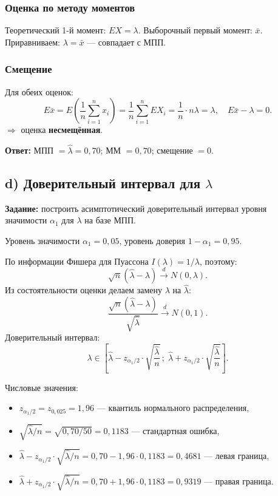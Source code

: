 \documentclass[12pt,a4paper]{article}
\newcommand{\lahat}{\hat{\lambda}}
\newcommand{\xbar}{\bar{x}}
\begin{document}
	\subsubsection*{Оценка по методу моментов}
	
	Теоретический 1-й момент: $EX = \lambda$. Выборочный первый момент: $\xbar$.
	Приравниваем: $\lambda = \xbar$ --- совпадает с МПП.
	
	\subsubsection*{Смещение}
	
	Для обеих оценок:
	\[
	E\xbar = E\!\left(\frac{1}{n}\sum_{i=1}^n x_i\right)
	= \frac{1}{n}\sum_{i=1}^n EX_i = \frac{1}{n}\cdot n\lambda = \lambda,
	\quad E\xbar - \lambda = 0.
	\]
	$\Rightarrow$ оценка \textbf{несмещённая}.
	
	\textbf{Ответ:} МПП $= \lahat = 0{,}70$;\; ММ $= 0{,}70$;\; смещение $= 0$.
	
	\subsection{d) Доверительный интервал для \texorpdfstring{$\lambda$}{lambda}}
	
	\textbf{Задание:} построить асимптотический доверительный интервал уровня
	значимости $\alpha_1$ для $\lambda$ на базе МПП.
	
	Уровень значимости $\alpha_1 = 0{,}05$, уровень доверия $1-\alpha_1 = 0{,}95$.
	
	По информации Фишера для Пуассона $I(\lambda) = 1/\lambda$, поэтому:
	\[
	\sqrt{n}(\lahat-\lambda) \xrightarrow{d} N(0,\lambda).
	\]
	Из состоятельности оценки делаем замену $\lambda$ на $\lahat$:
	\[
	\frac{\sqrt{n}(\lahat-\lambda)}{\sqrt{\lahat}} \xrightarrow{d} N(0,1).
	\]
	Доверительный интервал:
	\[
	\lambda \in \left[\lahat - z_{\alpha_1/2}\cdot\sqrt{\frac{\lahat}{n}}\,;\;
	\lahat + z_{\alpha_1/2}\cdot\sqrt{\frac{\lahat}{n}}\right].
	\]
	
	Числовые значения:
	\begin{itemize}
		\item $z_{\alpha_1/2} = z_{0{,}025} = 1{,}96$ --- квантиль нормального распределения,
		\item $\sqrt{\lahat/n} = \sqrt{0{,}70/50} = 0{,}1183$ --- стандартная ошибка,
		\item $\lahat - z_{\alpha_1/2}\cdot\sqrt{\lahat/n} = 0{,}70 - 1{,}96\cdot0{,}1183 = 0{,}4681$ --- левая граница,
		\item $\lahat + z_{\alpha_1/2}\cdot\sqrt{\lahat/n} = 0{,}70 + 1{,}96\cdot0{,}1183 = 0{,}9319$ --- правая граница.
	\end{itemize}
	
\end{document}
